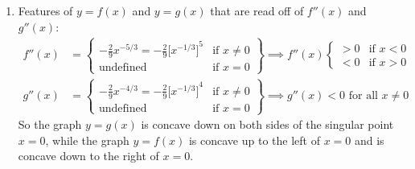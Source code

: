 \begin{eg}[Optional ---  $y=x^{1/3}$ and $y = x^{2/3}$]
\begin{enumerate}[(1)]
\item Features of $y=f(x)$ and $y=g(x)$ that are read off of $f''(x)$ 
      and $g''(x)$:
      \begin{align*}
         f''(x) &=  \left.\begin{cases}
                      -\tfrac{2}{9}x^{-5/3} =-\tfrac{2}{9}{\big[x^{-1/3}]}^{5}
                                                   & \text{if }x\ne 0 \\
                      \text{undefined} & \text{if }x =0  
              \end{cases}\right\}
              \implies f''(x) 
                      \begin{cases}>0&\text{if }x< 0\\ 
                                   <0&\text{if }x> 0
                    \end{cases} 
              \\
          g''(x) &=  \left.\begin{cases}
                      -\tfrac{2}{9}x^{-4/3} =-\tfrac{2}{9}{\big[x^{-1/3}]}^{4} 
                                               & \text{if }x\ne 0 \\
                      \text{undefined} & \text{if }x =0  
              \end{cases}\right\}
             \implies g''(x)<0\text{ for all }x\ne 0 
      \end{align*}
      So the graph $y=g(x)$ is concave down on both sides of the singular point   
      $x=0$, while the graph $y=f(x)$ is concave up to the left of $x=0$ and
      is concave down to the right of $x=0$.


\end{enumerate}
\end{eg}
